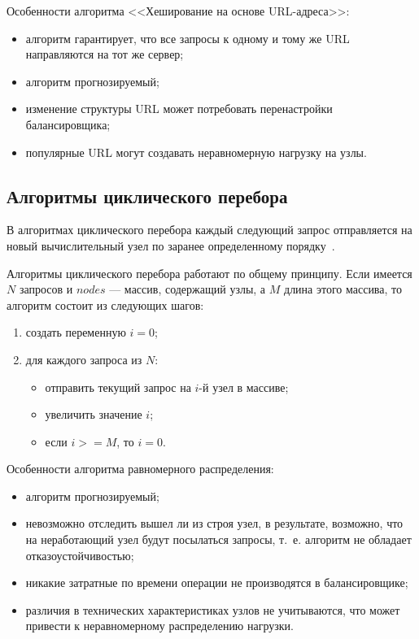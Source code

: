 Особенности алгоритма <<Хеширование на основе URL-адреса>>:
\begin{itemize}
	\item алгоритм гарантирует, что все запросы к одному и тому же URL направляются на тот же сервер;
	\item алгоритм прогнозируемый;
	\item изменение структуры URL может потребовать перенастройки балансировщика;
	\item популярные URL могут создавать неравномерную нагрузку на узлы.
\end{itemize}

\subsection{Алгоритмы циклического перебора}

В алгоритмах циклического перебора каждый следующий запрос отправляется на новый вычислительный узел по заранее определенному порядку~\cite{comp}.

Алгоритмы циклического перебора работают по общему принципу.
Если имеется $N$ запросов и $nodes$ --- массив, содержащий узлы, а $M$ длина этого массива, то алгоритм состоит из следующих шагов:
\begin{enumerate}
	\item создать переменную $i = 0$;
	\item для каждого запроса из $N$:
	\begin{itemize}
		\item отправить текущий запрос на $i$-й узел в массиве;
		\item увеличить значение $i$;
		\item если $i >= M$, то $i = 0$.
	\end{itemize}	
\end{enumerate}

Особенности алгоритма равномерного распределения:
\begin{itemize}
	\item алгоритм прогнозируемый;
	\item невозможно отследить вышел ли из строя узел, в результате, возможно, что на неработающий узел будут посылаться запросы, т.~е. алгоритм не обладает отказоустойчивостью;
	\item никакие затратные по времени операции не производятся в балансировщике;
	\item различия в технических характеристиках узлов не учитываются, что может привести к неравномерному распределению нагрузки.
\end{itemize}


